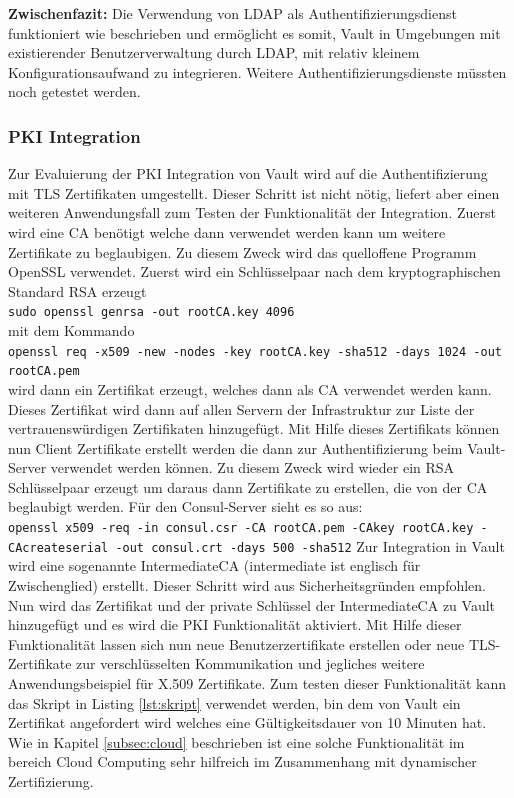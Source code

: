 \documentclass[
book,
a4paper,   
titlepage,  
halfparskip,
12pt        
]{scrartcl}
\newcommand\inline{\lstinline[basicstyle=\ttfamily]}
\begin{document}
\begin{onehalfspacing}
\textbf{Zwischenfazit:} Die Verwendung von LDAP als Authentifizierungsdienst funktioniert wie beschrieben und ermöglicht es somit, Vault in Umgebungen mit existierender Benutzerverwaltung durch LDAP, mit relativ kleinem Konfigurationsaufwand zu integrieren. Weitere Authentifizierungsdienste müssten noch getestet werden.

\subsubsection{\acs{PKI} Integration} 
Zur Evaluierung der \ac{PKI} Integration von Vault wird auf die Authentifizierung mit \ac{TLS} Zertifikaten umgestellt. Dieser Schritt ist nicht nötig, liefert aber einen weiteren Anwendungsfall zum Testen der Funktionalität der Integration. Zuerst wird eine \ac{CA} benötigt welche dann verwendet werden kann um weitere Zertifikate zu beglaubigen. Zu diesem Zweck wird das quelloffene Programm OpenSSL verwendet. Zuerst wird ein Schlüsselpaar nach dem kryptographischen Standard RSA erzeugt\\\inline|sudo openssl genrsa -out rootCA.key 4096|\\ mit dem Kommando\\\inline|openssl req -x509 -new -nodes -key rootCA.key -sha512 -days 1024 -out rootCA.pem|\\ wird dann ein Zertifikat erzeugt, welches dann als \ac{CA} verwendet werden kann. Dieses Zertifikat wird dann auf allen Servern der Infrastruktur zur Liste der vertrauenswürdigen Zertifikaten hinzugefügt. Mit Hilfe dieses Zertifikats können nun Client Zertifikate erstellt werden die dann zur Authentifizierung beim Vault-Server verwendet werden können. Zu diesem Zweck wird wieder ein RSA Schlüsselpaar erzeugt um daraus dann Zertifikate zu erstellen, die von der \ac{CA} beglaubigt werden. Für den Consul-Server sieht es so aus:\cite{openssl}\\\inline|openssl x509 -req -in consul.csr -CA rootCA.pem -CAkey rootCA.key -CAcreateserial -out consul.crt -days 500 -sha512|\newline
Zur Integration in Vault wird eine sogenannte Intermediate\ac{CA} (intermediate ist englisch für Zwischenglied) erstellt. Dieser Schritt wird aus Sicherheitsgründen empfohlen. Nun wird das Zertifikat und der private Schlüssel der Intermediate\ac{CA} zu Vault hinzugefügt und es wird die \ac{PKI} Funktionalität aktiviert. Mit Hilfe dieser Funktionalität lassen sich nun neue Benutzerzertifikate erstellen oder neue \ac{TLS}-Zertifikate zur verschlüsselten Kommunikation und jegliches weitere Anwendungsbeispiel für X.509 Zertifikate. Zum testen dieser Funktionalität kann das Skript in Listing \vref{lst:skript} verwendet werden, bin dem von Vault ein Zertifikat angefordert wird welches eine Gültigkeitsdauer von 10 Minuten hat. Wie in Kapitel \vref{subsec:cloud} beschrieben ist eine solche Funktionalität im bereich Cloud Computing sehr hilfreich im Zusammenhang mit dynamischer Zertifizierung.  



\end{onehalfspacing}
\end{document}
